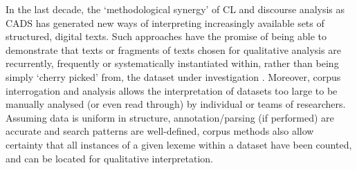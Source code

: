 In the last decade, the `methodological synergy' of \gls{CL} and discourse analysis as \gls{CADS} has generated new ways of interpreting increasingly available sets of structured, digital texts. Such approaches have the promise of being able to demonstrate that texts or fragments of texts chosen for qualitative analysis are recurrently, frequently or systematically instantiated within, rather than being simply `cherry picked' from, the dataset under investigation \cite[see][]{baker_useful_2008}. Moreover, corpus interrogation and analysis allows the interpretation of datasets too large to be manually analysed (or even read through) by individual or teams of researchers. Assuming data is uniform in structure, annotation\slash parsing (if performed) are accurate and search patterns are well\hyp{}defined, corpus methods also allow certainty that all instances of a given lexeme within a dataset have been counted, and can be located for qualitative interpretation.


